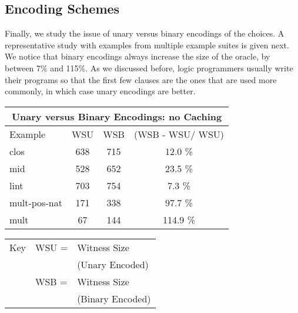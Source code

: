 \documentclass{llncs}
\begin{document}
\subsection{Encoding Schemes}
Finally, we study the issue of unary versus binary encodings of the choices.
A representative study with examples from multiple example suites is given
next. %
 We notice that binary encodings always 
increase the size of the oracle, by between 7\% and 115\%. As we discussed
before, logic programmers usually write their programs so that the first
few clauses are the ones that are used more commonly, in which case unary 
encodings are better.

\begin{tabbing}
\begin{small}
\begin{minipage}{3in}
\begin{tabular}{|l|c|c|c|}
\multicolumn{4}{c}{Unary versus Binary Encodings: no Caching}\\
\hline
Example & WSU & WSB & (WSB - WSU/ WSU) \\
\hline
clos & 638 & 715 & 12.0 \%\\
mid & 528 & 652 & 23.5 \%\\
lint & 703 & 754 & 7.3 \%\\
mult-pos-nat & 171 & 338 & 97.7 \%\\
mult & 67 & 144 & 114.9 \%\\
\hline
\end{tabular}
\end{minipage}
\begin{minipage}{2in}
\begin{tabular}{lll}
Key & WSU = & Witness Size \\ &&(Unary Encoded)\\
&WSB = & Witness Size \\&&(Binary Encoded)\\
\end{tabular} 
\end{minipage}
\end{small}
\end{tabbing}
\end{document}
